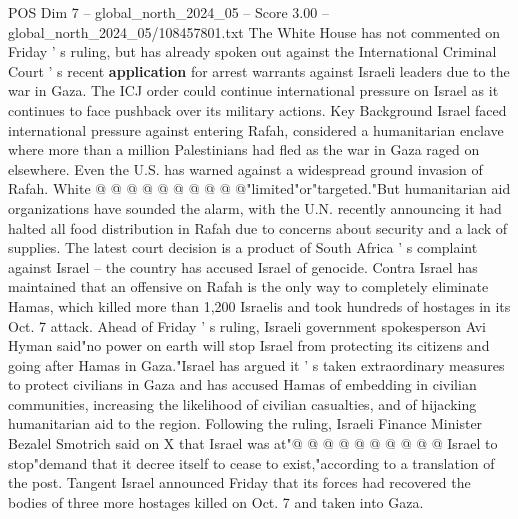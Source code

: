 \begin{textsample}{POS Dim 7 – global\_north\_2024\_05 – Score 3.00 – global\_north\_2024\_05/108457801.txt}
The White House has not commented on Friday ' s ruling, but has already spoken out against the International Criminal Court ' s recent \textbf{application} for arrest warrants against Israeli leaders due to the war in Gaza.
The ICJ order could continue international pressure on Israel as it continues to face pushback over its military actions.
Key Background Israel faced international pressure against entering Rafah, considered a humanitarian enclave where more than a million Palestinians had fled as the war in Gaza raged on elsewhere.
Even the U.S. has warned against a widespread ground invasion of Rafah.
White @ @ @ @ @ @ @ @ @ @"limited"or"targeted."But humanitarian aid organizations have sounded the alarm, with the U.N. recently announcing it had halted all food distribution in Rafah due to concerns about security and a lack of supplies.
The latest court decision is a product of South Africa ' s complaint against Israel -- the country has accused Israel of genocide.
Contra Israel has maintained that an offensive on Rafah is the only way to completely eliminate Hamas, which killed more than 1,200 Israelis and took hundreds of hostages in its Oct. 7 attack.
Ahead of Friday ' s ruling, Israeli government spokesperson Avi Hyman said"no power on earth will stop Israel from protecting its citizens and going after Hamas in Gaza."Israel has argued it ' s taken extraordinary measures to protect civilians in Gaza and has accused Hamas of embedding in civilian communities, increasing the likelihood of civilian casualties, and of hijacking humanitarian aid to the region.
Following the ruling, Israeli Finance Minister Bezalel Smotrich said on X that Israel was at"@ @ @ @ @ @ @ @ @ @ Israel to stop"demand that it decree itself to cease to exist,"according to a translation of the post.
Tangent Israel announced Friday that its forces had recovered the bodies of three more hostages killed on Oct. 7 and taken into Gaza.

\end{textsample}
